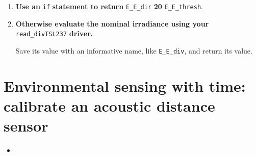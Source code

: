 {\begin{enumerate}
	\item \textbf{Use an} \lstinline{if} \textbf{statement to return} \lstinline{E_E_dir} \textbf{20} \lstinline{E_E_thresh}.

	\item \textbf{Otherwise evaluate the nominal irradiance using your} \lstinline{read_divTSL237} \textbf{driver.}

	Save its value with an informative name, like \lstinline{E_E_div}, and return its value.
\end{enumerate}



%
%
%




%


%








\vspace{4cm}



\section[\color{gray} Environmental sensing with time \color{black}]{Environmental sensing with time: calibrate an acoustic distance sensor}
\begin{itemize}
	\item
\end{itemize}

}
